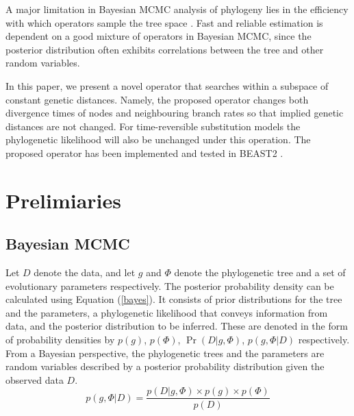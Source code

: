 \documentclass{bmcart}
\begin{document}
A major limitation in Bayesian MCMC analysis of phylogeny lies in the efficiency with which operators sample the tree space \cite{lakner2008efficiency,hohna2012guided}. Fast and reliable estimation is dependent on a good mixture of operators in Bayesian MCMC, since the posterior distribution often exhibits correlations between the tree and other random variables.

In this paper, we present a novel operator that searches within a subspace of constant genetic distances.
Namely, the proposed operator changes both divergence times of nodes and neighbouring branch rates so that implied genetic distances are not changed. For time-reversible substitution models the phylogenetic likelihood will also be unchanged under this operation. The proposed operator has been implemented and tested in BEAST2 \cite{bouckaert2014beast}.

\section*{Prelimiaries}
\subsection*{Bayesian MCMC}
Let $D$ denote the data, and let $g$ and $\Phi $ denote the phylogenetic tree and a set of evolutionary parameters respectively. The posterior probability density can be calculated using Equation (\ref{bayes}). It consists of prior distributions for the  tree and the parameters, a phylogenetic likelihood that conveys information from data, and the posterior distribution to be inferred. These are denoted in the form of probability densities by $p(g) $, $p(\Phi )$, $\Pr(D|g,\Phi )$, $p(g,\Phi |D)$ respectively. From a Bayesian perspective, the phylogenetic trees and the parameters are random variables described by a posterior probability distribution given the observed data $D$.
\begin{equation}\label{bayes}
p(g,\Phi |D) = \frac{{p (D|g,\Phi ) \times p (g) \times p (\Phi )}}{{p (D)}}
\end{equation}
\end{document}
